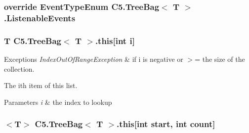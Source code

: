 \subsubsection[{Listenable\+Events}]{\setlength{\rightskip}{0pt plus 5cm}override {\bf Event\+Type\+Enum} {\bf C5.\+Tree\+Bag}$<$ T $>$.Listenable\+Events\hspace{0.3cm}{\ttfamily [get]}}\label{class_c5_1_1_tree_bag_a51345f4ffe46dd62758f63ff084f3062}




\hypertarget{class_c5_1_1_tree_bag_a912d39c72ddaee09533750ce5a978461}{}
\subsubsection[{this[int i]}]{\setlength{\rightskip}{0pt plus 5cm}T {\bf C5.\+Tree\+Bag}$<$ T $>$.this\mbox{[}int i\mbox{]}\hspace{0.3cm}{\ttfamily [get]}}\label{class_c5_1_1_tree_bag_a912d39c72ddaee09533750ce5a978461}



\begin{DoxyExceptions}{Exceptions}
{\em Index\+Out\+Of\+Range\+Exception} & if i is negative or $>$= the size of the collection. \\
\hline
\end{DoxyExceptions}


The i\textquotesingle{}th item of this list.


\begin{DoxyParams}{Parameters}
{\em i} & the index to lookup\\
\hline
\end{DoxyParams}
\hypertarget{class_c5_1_1_tree_bag_a34880d76610a5dd5063149053fb549d1}{}
\subsubsection[{this[int start, int count]}]{$<$T$>$ {\bf C5.\+Tree\+Bag}$<$ T $>$.this\mbox{[}int start, int count\mbox{]}\hspace{0.3cm}{\ttfamily [get]}}\label{class_c5_1_1_tree_bag_a34880d76610a5dd5063149053fb549d1}



